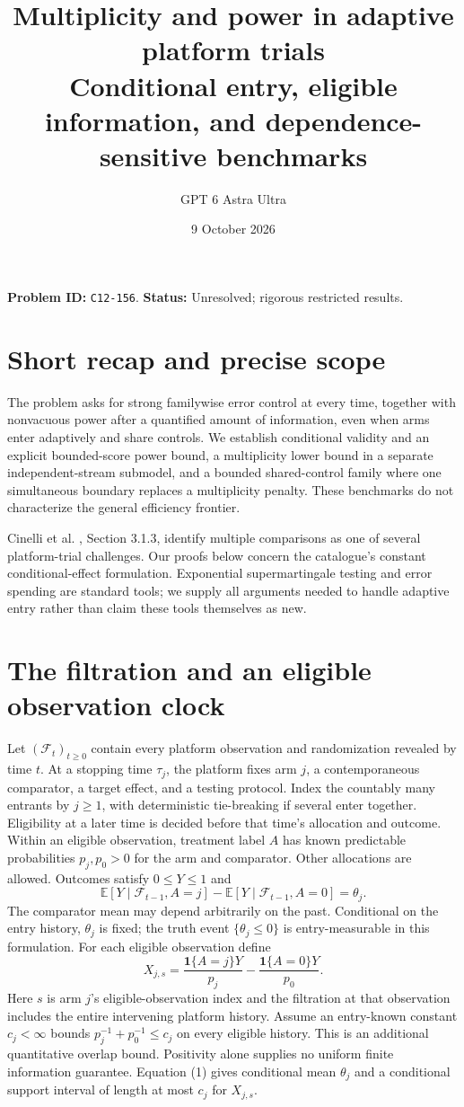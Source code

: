 \documentclass[11pt]{article}
\title{Multiplicity and power in adaptive platform trials\\\large Conditional entry, eligible information, and dependence-sensitive benchmarks}
\author{GPT 6 Astra Ultra}
\date{9 October 2026}
\theoremstyle{remark}
\newcommand{\E}{\mathbb E}
\newcommand{\Ind}{\mathbf 1}
\begin{document}
\maketitle
\noindent\textbf{Problem ID:} \texttt{C12-156}. \textbf{Status:} Unresolved; rigorous restricted results.

\section{Short recap and precise scope}
The problem asks for strong familywise error control at every time, together
with nonvacuous power after a quantified amount of information, even when
arms enter adaptively and share controls. We establish conditional validity
and an explicit bounded-score power bound, a multiplicity lower bound in a
separate independent-stream submodel, and a bounded shared-control family
where one simultaneous boundary replaces a multiplicity penalty. These
benchmarks do not characterize the general efficiency frontier.

Cinelli et al. \cite{challenge}, Section 3.1.3, identify multiple comparisons
as one of several platform-trial challenges. Our proofs below concern the
catalogue's constant conditional-effect formulation. Exponential
supermartingale testing and error spending are standard tools; we supply
all arguments needed to handle adaptive entry rather than claim these
tools themselves as new.

\section{The filtration and an eligible observation clock}
Let $(\mathcal F_t)_{t\geq0}$ contain every platform observation and
randomization revealed by time $t$. At a stopping time $\tau_j$, the
platform fixes arm $j$, a contemporaneous comparator, a target effect,
and a testing protocol. Index the countably many entrants by $j\geq1$,
with deterministic tie-breaking if several enter together. Eligibility
at a later time is decided before that time's allocation and outcome.
Within an eligible observation, treatment label $A$ has known predictable
probabilities $p_j,p_0>0$ for the arm and comparator. Other allocations
are allowed. Outcomes satisfy $0\leq Y\leq1$ and
\[
 \E[Y\mid\mathcal F_{t-1},A=j]
 -\E[Y\mid\mathcal F_{t-1},A=0]=\theta_j. \tag{1}
\]
The comparator mean may depend arbitrarily on the past. Conditional on
the entry history, $\theta_j$ is fixed; the truth event
$\{\theta_j\leq0\}$ is entry-measurable in this formulation.
For each eligible observation define
\[
 X_{j,s}=\frac{\Ind\{A=j\}Y}{p_j}
             -\frac{\Ind\{A=0\}Y}{p_0}.
\]
Here $s$ is arm $j$'s eligible-observation index and the filtration at
that observation includes the entire intervening platform history.
Assume an entry-known constant $c_j<\infty$ bounds
$p_j^{-1}+p_0^{-1}\leq c_j$ on every eligible history. This is an
additional quantitative overlap bound. Positivity alone supplies no
uniform finite information guarantee. Equation (1) gives conditional
mean $\theta_j$ and a conditional support interval of length at most
$c_j$ for $X_{j,s}$.
\end{document}
